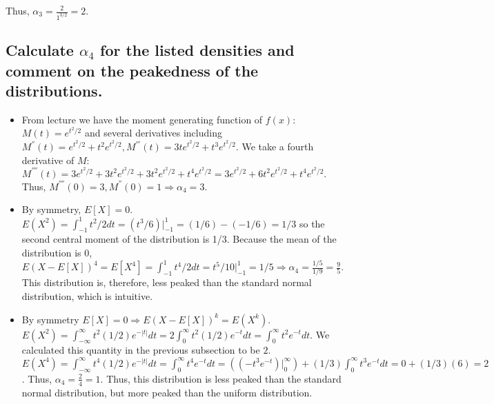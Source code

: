 \documentclass[11pt]{article} %
\begin{document}
Thus, $\alpha_3 = \frac{2}{1^{3/2}} = 2.$

\subsection{Calculate $\alpha_4$ for the listed densities and comment on the peakedness of the distributions.}
\begin{itemize}
\item From lecture we have the moment generating function of $f(x)$: $M(t) = e^{t^2/2}$ and several derivatives including $M^{''}(t) = e^{t^2/2} + t^2 e^{t^2/2}, M^{'''}(t) = 3t e^{t^2/2} + t^3e^{t^2/2}.$ We take a fourth derivative of $M$: $ M^{''''}(t) = 3e^{t^2/2} + 3t^2e^{t^2/2} + 3t^2e^{t^2/2} + t^4 e^{t^2/2} =  3e^{t^2/2} +  6t^2e^{t^2/2} + t^4 e^{t^2/2}.$ Thus, $M^{''''}(0) = 3, M^{''}(0) = 1 \Rightarrow \alpha_4 = 3.$ 
\item By symmetry, $E[X] = 0.$ $E(X^2) = \int_{-1}^{1} t^2/2dt = (t^3/6)|_{-1}^{1} = (1/6) -(-1/6) = 1/3$ so the second central moment of the distribution is 1/3. Because the mean of the distribution is 0, $E(X-E[X])^4 = E[X^4] = \int_{-1}^1 t^4/2 dt = t^5/10|_{-1}^{1} = 1/5 \Rightarrow \alpha_4 = \frac{1/5}{1/9} = \frac{9}{5}.$ This distribution is, therefore, less peaked than the standard normal distribution, which is intuitive.
\item By symmetry $E[X] = 0 \Rightarrow E(X-E[X])^k = E(X^k).$ $E(X^2) = \int_{-\infty}^{\infty}t^2(1/2)e^{-|t|}dt = 2\int_{0}^{\infty}t^2(1/2)e^{-t}dt =  \int_{0}^{\infty}t^2e^{-t}dt.$ We calculated this quantity in the previous subsection to be $2$.  $E(X^4) = \int_{-\infty}^{\infty}t^4(1/2)e^{-|t|}dt = \int_{0}^{\infty}t^4e^{-t}dt = ((-t^3 e^{-t})|_{0}^{\infty}) + (1/3)\int_{0}^{\infty} t^3e^{-t}dt = 0 + (1/3)(6)  =2$. Thus, $\alpha_4 = \frac{2}{4} = 1.$ Thus, this distribution is less peaked than the standard normal distribution, but more peaked than the uniform distribution.
\end{itemize}
\end{document}
